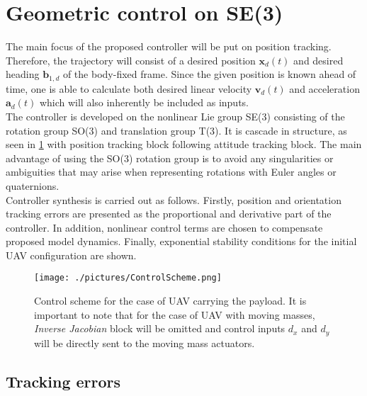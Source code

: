 \section{Geometric control on SE(3)}

The main focus of the proposed controller will be put on position tracking. Therefore, the trajectory will consist of a desired position $\textbf{x}_d(t)$ and desired heading $\textbf{b}_{1,d}$ of the body-fixed frame. Since the given position is known ahead of time, one is able to calculate both desired linear velocity $\textbf{v}_d(t)$ and acceleration $\textbf{a}_d(t)$ which will also inherently be included as inputs. \\
The controller is developed on the nonlinear Lie group SE(3) consisting of the rotation group SO(3) and translation group T(3). It is cascade in structure, as seen in \ref{fig:control_scheme} with position tracking block following attitude tracking block. The main advantage of using the SO(3) rotation group is to avoid any singularities or ambiguities that may arise when representing rotations with Euler angles or quaternions. \\
Controller synthesis is carried out as follows. Firstly, position and orientation tracking errors are presented as the proportional and derivative part of the controller. In addition, nonlinear control terms are chosen to compensate proposed model dynamics. Finally, exponential stability conditions for the initial UAV configuration are shown.

\begin{figure}[h!]
	\centering
	\texttt{[image: ./pictures/ControlScheme.png]}	
	\caption{Control scheme for the case of UAV carrying the payload. It is important to note that for the case of UAV with moving masses, \textit{Inverse Jacobian} block will be omitted and control inputs $d_x$ and $d_y$ will be directly sent to the moving mass actuators.}
	\label{fig:control_scheme}
\end{figure}

\subsection{Tracking errors}

